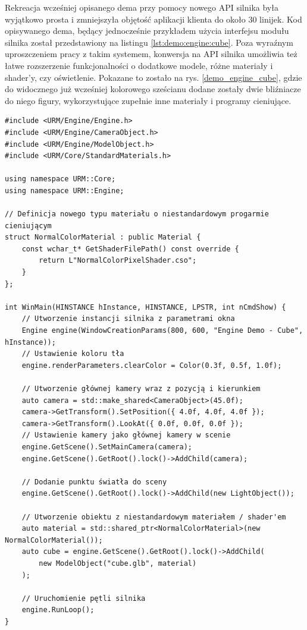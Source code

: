 Rekreacja wcześniej opisanego dema przy pomocy nowego API silnika była wyjątkowo prosta i zmniejszyła objętość aplikacji klienta do około 30 linijek. Kod opisywanego dema, będący jednocześnie przykładem użycia interfejsu modułu silnika został przedstawiony na listingu \ref{lst:demo:engine:cube}. Poza wyraźnym uproszczeniem pracy z takim systemem, konwersja na API silnika umożliwia też łatwe rozszerzenie funkcjonalności o dodatkowe modele, różne materiały i shader'y, czy oświetlenie. Pokazane to zostało na rys. \ref{demo_engine_cube}, gdzie do widocznego już wcześniej kolorowego sześcianu dodane zostały dwie bliźniacze do niego figury, wykorzystujące zupełnie inne materiały i programy cieniujące.

\begin{lstlisting}[caption={Pełny kod programu wykorzystującego API silnika do wyświetlenia trzech sześcianów o różnych materiałach.}, label={lst:demo:engine:cube}]
#include <URM/Engine/Engine.h>
#include <URM/Engine/CameraObject.h>
#include <URM/Engine/ModelObject.h>
#include <URM/Core/StandardMaterials.h>

using namespace URM::Core;
using namespace URM::Engine;

// Definicja nowego typu materiału o niestandardowym progarmie cieniującym
struct NormalColorMaterial : public Material {
	const wchar_t* GetShaderFilePath() const override { 
		return L"NormalColorPixelShader.cso";
	}
};
	
int WinMain(HINSTANCE hInstance, HINSTANCE, LPSTR, int nCmdShow) {
	// Utworzenie instancji silnika z parametrami okna
	Engine engine(WindowCreationParams(800, 600, "Engine Demo - Cube", hInstance));
	// Ustawienie koloru tła
	engine.renderParameters.clearColor = Color(0.3f, 0.5f, 1.0f);
	
	// Utworzenie głównej kamery wraz z pozycją i kierunkiem
	auto camera = std::make_shared<CameraObject>(45.0f);
	camera->GetTransform().SetPosition({ 4.0f, 4.0f, 4.0f });
	camera->GetTransform().LookAt({ 0.0f, 0.0f, 0.0f });
	// Ustawienie kamery jako głównej kamery w scenie
	engine.GetScene().SetMainCamera(camera);
	engine.GetScene().GetRoot().lock()->AddChild(camera);
	
	// Dodanie punktu światła do sceny
	engine.GetScene().GetRoot().lock()->AddChild(new LightObject());
	
	// Utworzenie obiektu z niestandardowym materiałem / shader'em
	auto material = std::shared_ptr<NormalColorMaterial>(new NormalColorMaterial());
	auto cube = engine.GetScene().GetRoot().lock()->AddChild(
		new ModelObject("cube.glb", material)
	);
	
	// Uruchomienie pętli silnika
	engine.RunLoop();
}
\end{lstlisting}

